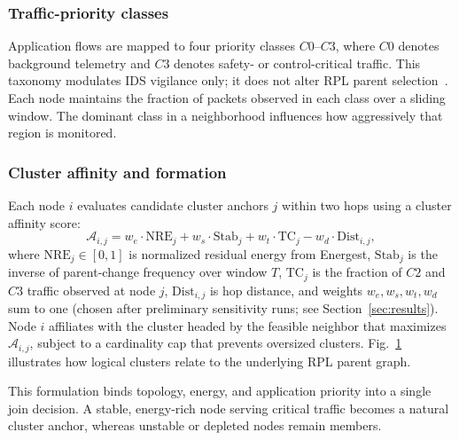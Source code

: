 \subsubsection{Traffic-priority classes}
Application flows are mapped to four priority classes $C0$--$C3$, where $C0$ denotes background telemetry and $C3$ denotes safety- or control-critical traffic.
This taxonomy modulates IDS vigilance only; it does not alter RPL parent selection~\cite{beno2018qosrpl}.
Each node maintains the fraction of packets observed in each class over a sliding window.
The dominant class in a neighborhood influences how aggressively that region is monitored.

\subsubsection{Cluster affinity and formation}
Each node $i$ evaluates candidate cluster anchors $j$ within two hops using a cluster affinity score:
\begin{equation}
\label{eq:affinity}
\mathcal{A}_{i,j} = w_e \cdot \mathrm{NRE}_j + w_s \cdot \mathrm{Stab}_j + w_t \cdot \mathrm{TC}_j - w_d \cdot \mathrm{Dist}_{i,j},
\end{equation}
where $\mathrm{NRE}_j \in [0,1]$ is normalized residual energy from Energest, $\mathrm{Stab}_j$ is the inverse of parent-change frequency over window $T$, $\mathrm{TC}_j$ is the fraction of $C2$ and $C3$ traffic observed at node $j$, $\mathrm{Dist}_{i,j}$ is hop distance, and weights $w_e,w_s,w_t,w_d$ sum to one (chosen after preliminary sensitivity runs; see Section~\ref{sec:results}).
Node $i$ affiliates with the cluster headed by the feasible neighbor that maximizes $\mathcal{A}_{i,j}$, subject to a cardinality cap that prevents oversized clusters.
Fig.~\ref{fig:cluster-overlay} illustrates how logical clusters relate to the underlying RPL parent graph.

\begin{figure}[!t]
  \centering
  \resizebox{\linewidth}{!}{}
  \caption{\CaptionFigTwo}
  \label{fig:cluster-overlay}
\end{figure}

This formulation binds topology, energy, and application priority into a single join decision.
A stable, energy-rich node serving critical traffic becomes a natural cluster anchor, whereas unstable or depleted nodes remain members.

